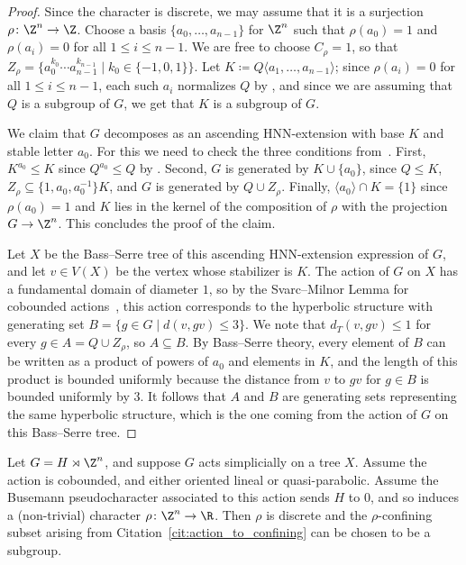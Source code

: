 \begin{proof}
Since the character is discrete, we may assume that it is a surjection $\rho \colon \Z^n \to \Z$. Choose a basis $\{a_0,\dots,a_{n-1}\}$ for $\Z^n$ such that $\rho(a_0)=1$ and $\rho(a_i)=0$ for all $1\le i\le n-1$. We are free to choose $C_\rho=1$, so that $Z_\rho=\{a_0^{k_0}\cdots a_{n-1}^{k_{n-1}}\mid k_0\in\{-1,0,1\}\}$. Let $K\coloneqq Q\langle a_1,\dots,a_{n-1}\rangle$; since $\rho(a_i)=0$ for all $1\le i\le n-1$, each such $a_i$ normalizes $Q$ by \StayInConf, and since we are assuming that $Q$ is a subgroup of $G$, we get that $K$ is a subgroup of $G$.

We claim that $G$ decomposes as an ascending HNN-extension with base $K$ and stable letter $a_0$. For this we need to check the three conditions from~\cite[Lemma~3.1]{ascending}. First, $K^{a_0}\le K$ since $Q^{a_0}\le Q$ by \StayInConf. Second, $G$ is generated by $K\cup\{a_0\}$, since $Q\le K$, $Z_\rho\subseteq \{1,a_0,a_0^{-1}\}K$, and $G$ is generated by $Q\cup Z_\rho$. Finally, $\langle a_0\rangle\cap K=\{1\}$ since $\rho(a_0)=1$ and $K$ lies in the kernel of the composition of $\rho$ with the projection $G\to\Z^n$. This concludes the proof of the claim.

Let $X$ be the Bass--Serre tree of this ascending HNN-extension expression of $G$, and let $v \in V(X)$ be the vertex whose stabilizer is $K$. The action of $G$ on $X$ has a fundamental domain of diameter $1$, so by the Svarc--Milnor Lemma for cobounded actions~\cite[Lemma 3.11]{ABO}, this action corresponds to the hyperbolic structure with generating set
\(B = \{ g \in G \mid d(v, gv) \leq 3 \}.\)
We note that $d_T(v, gv) \leq 1$ for every $g \in A = Q \cup Z_\rho$, so $A \subseteq B$. By Bass--Serre theory, every element of $B$ can be written as a product of powers of $a_0$ and elements in $K$, and the length of this product is bounded uniformly because the distance from $v$ to $gv$ for $g\in B$ is bounded uniformly by $3$. It follows that $A$ and $B$ are generating sets representing the same hyperbolic structure, which is the one coming from the action of $G$ on this Bass--Serre tree.
\end{proof}

\begin{prop} \label{prop:trees_to_subgroups}
Let $G=H\rtimes \Z^n$, and suppose $G$ acts simplicially on a tree $X$. Assume the action is cobounded, and either oriented lineal or quasi-parabolic. Assume the Busemann pseudocharacter associated to this action sends $H$ to $0$, and so induces a (non-trivial) character $\rho\colon \Z^n\to\R$. Then $\rho$ is discrete and the $\rho$-confining subset arising from Citation~\ref{cit:action_to_confining} can be chosen to be a subgroup.
\end{prop}

